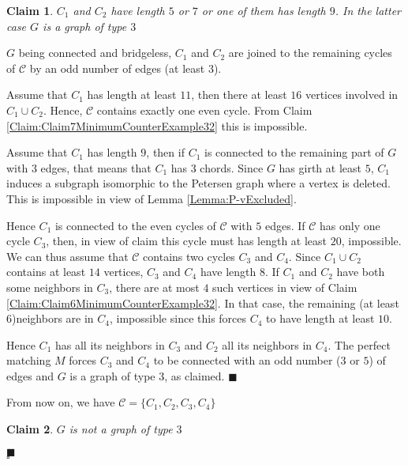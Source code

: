 \documentclass{elsart}
\theoremstyle{plain} \theoremheaderfont{\scshape}
\newtheorem{Clm}{Claim}[Thm]
\newenvironment{Prf}{{\bf \noindent Proof } }{\hfill$\square$\\}
\newenvironment{PrfClaim}{{\bf Proof }}{{\hfill\tiny{$\blacksquare$\\}}}
\begin{document}
\begin{Prf}
\begin{Clm} \label{Claim:Claim8MinimumCounterExample32}
$C_1$ and $C_2$ have length $5$ or $7$ or one of them has length
$9$. In the latter case $G$ is a graph of type $3$
\end{Clm}
\begin{PrfClaim}
$G$ being connected and  bridgeless, $C_1$ and $C_2$ are joined to
the remaining cycles of $\mathcal C$ by an odd number of edges (at
least $3$).

Assume that $C_1$ has length at least $11$, then there at least $16$
vertices involved in $C_1 \cup C_2$. Hence, $\mathcal C$ contains
exactly one even cycle. From Claim
\ref{Claim:Claim7MinimumCounterExample32} this is  impossible.

Assume that $C_1$ has length  $9$, then if $C_1$ is connected to the
remaining part of $G$ with $3$ edges, that means that $C_1$ has $3$
chords. Since $G$ has girth at least $5$, $C_1$ induces a subgraph
isomorphic to the Petersen graph where a vertex is deleted. This is
impossible in view of Lemma \ref{Lemma:P-vExcluded}.

Hence $C_1$ is connected to the even cycles of $\mathcal C$ with $5$
edges. If $\mathcal C$ has only one cycle $C_3$, then, in view of
claim this cycle must has length at least $20$, impossible. We can
thus assume that $\mathcal C$ contains two cycles $C_3$ and $C_4$.
Since $C_1 \cup C_2$ contains at least $14$ vertices, $C_3$ and
$C_4$ have length $8$. If $C_1$ and $C_2$ have both some neighbors
in $C_3$, there are at most $4$ such vertices in view of Claim
\ref{Claim:Claim6MinimumCounterExample32}. In that case, the
remaining (at least $6$)neighbors are in $C_4$, impossible since
this forces $C_4$ to have length at least $10$.

Hence $C_1$ has all its neighbors in $C_3$ and $C_2$ all its
neighbors in $C_4$. The perfect matching $M$ forces $C_3$ and $C_4$
to be connected with an odd number ($3$ or $5$) of edges and $G$ is
a graph of type 3, as claimed.
\end{PrfClaim}





From now on, we have  $\mathcal C= \{C_1,C_2,C_3,C_4\}$

\begin{Clm} \label{Claim:Claim9MinimumCounterExample32}
$G$ is not a graph of type $3$
\end{Clm}
\begin{PrfClaim}


\end{PrfClaim}
\end{Prf}
\end{document}
